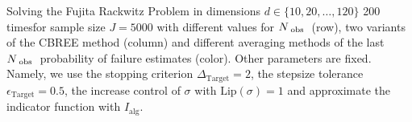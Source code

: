 Solving the Fujita Rackwitz Problem in dimensions $d \in \{10, 20, \ldots, 120\}$ 200 timesfor sample size $J = 5000$  with different values for $N_{ \textup{ obs } }$  (row), two variants of the CBREE method (column) and different averaging methods of the last $N_{ \textup{ obs } }$ probability of failure estimates (color). Other parameters are fixed. Namely, we use the stopping criterion $\Delta_{\text{Target}} = 2$, the stepsize tolerance $\epsilon_{\text{Target}} = 0.5$, the increase control  of $\sigma$ with $\text{Lip}(\sigma) = 1$ and approximate the indicator function with $I_\text{alg}$.